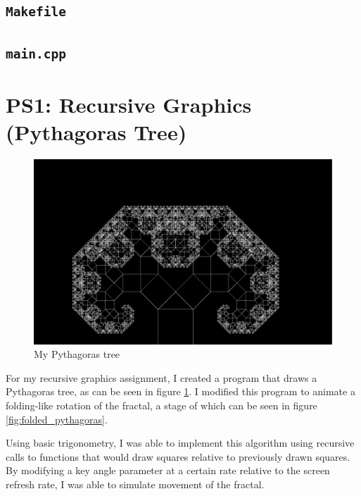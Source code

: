 \documentclass[12pt]{article}
\begin{document}
\subsection{\texttt{Makefile}}



\subsection{\texttt{main.cpp}}



\newpage

\section{PS1: Recursive Graphics (Pythagoras Tree)}


\begin{figure}

\includegraphics[scale=0.2]{../ps1/screenshot.png}
\centering
\caption{My Pythagoras tree}
\label{fig:pythagoras}
\end{figure}


For my recursive graphics assignment, I created a program that draws a Pythagoras tree, as can be seen in figure \ref{fig:pythagoras}. I modified this program to animate a folding-like rotation of the fractal, a stage of which can be seen in figure  \ref{fig:folded_pythagoras}.

Using basic trigonometry, I was able to implement this algorithm using recursive calls to functions that would draw squares relative to previously drawn squares. By modifying a key angle parameter at a certain rate relative to the screen refresh rate, I was able to simulate movement of the fractal.
\end{document}
